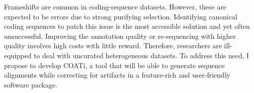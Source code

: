 Frameshifts are common in coding-sequence datasets.
However, these are expected to be errors due to strong purifying selection.
Identifying canonical coding sequences to patch this issue is the most
accessible solution and yet often unsuccessful.
Improving the annotation quality or re-sequencing with higher quality involves
high costs with little reward.
Therefore, researchers are ill-equipped to deal with uncurated heterogeneous
datasets.
To address this need, I propose to develop COATi, a tool that will be able to
generate sequence alignments while correcting for artifacts in a feature-rich
and user-friendly software package.

